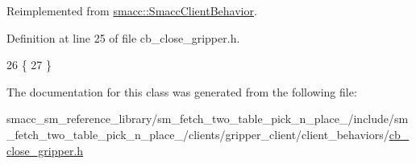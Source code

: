 Reimplemented from \hyperlink{classsmacc_1_1SmaccClientBehavior_a7e4fb6ce81ff96dc172425852d69c0c5}{smacc\+::\+Smacc\+Client\+Behavior}.



Definition at line 25 of file cb\+\_\+close\+\_\+gripper.\+h.


\begin{DoxyCode}
26     \{
27     \}
\end{DoxyCode}


The documentation for this class was generated from the following file\+:\begin{DoxyCompactItemize}
\item 
smacc\+\_\+sm\+\_\+reference\+\_\+library/sm\+\_\+fetch\+\_\+two\+\_\+table\+\_\+pick\+\_\+n\+\_\+place\+\_/include/sm\+\_\+fetch\+\_\+two\+\_\+table\+\_\+pick\+\_\+n\+\_\+place\+\_/clients/gripper\+\_\+client/client\+\_\+behaviors/\hyperlink{sm__fetch__two__table__pick__n__place__1_2include_2sm__fetch__two__table__pick__n__place__1_2cli9fa49da810358bc3da34abe22ec5e233}{cb\+\_\+close\+\_\+gripper.\+h}\end{DoxyCompactItemize}
